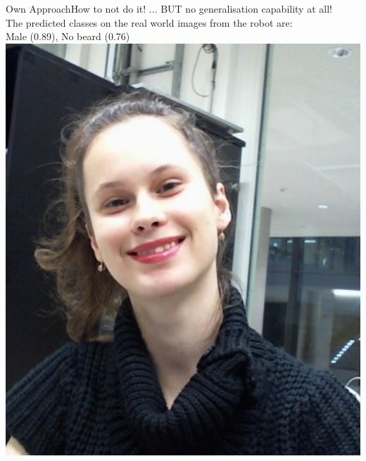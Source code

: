 \documentclass{beamer}
\begin{document}
\begin{frame}{Own Approach}{How to not do it!}
... BUT no generalisation capability at all! \\
The predicted classes on the real world images from the robot are: \\
\centering
Male (0.89), No beard (0.76) \\
\centering
\includegraphics[height=0.6\textheight]{figures/failMaleNoBeard} 
\end{frame}
\end{document}
